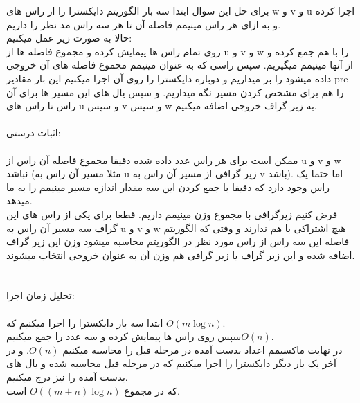 \problem{}
برای حل این سوال ابتدا سه بار الگوریتم دایکسترا را از
راس های w و v و u
اجرا کرده و به ازای هر راس
مینیمم فاصله آن تا هر سه راس مد نظر را داریم.\\
حالا به صورت زیر عمل میکنیم:\\
روی تمام راس ها پیمایش کرده و مجموع فاصله ها از u و v و w را با هم جمع
کرده و از آنها مینیمم میگیریم.
سپس راسی که به عنوان مینیمم مجموع فاصله های آن خروجی داده میشود را 
بر میداریم و دوباره دایکسترا را روی آن اجرا میکنیم این بار مقادیر pre را هم برای
مشخص کردن مسیر نگه میداریم.
و سپس یال های این مسیر ها برای آن راس تا 
راس های u و 
سپس v و
سپس w 
به زیر گراف خروجی اضافه میکنیم.\\\\
اثبات درستی:\\\\
ممکن است برای هر راس عدد داده شده دقیقا مجموع فاصله آن راس از u و v و w نباشد 
(مثلا مسیر آن راس به u زیر گرافی از مسیر آن راس به v باشد).
اما حتما یک راس وجود دارد که دقیقا با جمع کردن این سه مقدار
 اندازه مسیر مینیمم را به ما میدهد.\\
فرض کنیم زیرگرافی با مجموع وزن مینیمم داریم.
قطعا برای یکی از راس های این گراف سه مسیر آن راس به u و v و w 
هیچ اشتراکی با هم ندارند و وقتی که الگوریتم فاصله این سه راس از راس مورد نظر در
الگوریتم محاسبه میشود وزن این زیر گراف اضافه شده و این زیر گراف یا زیر گرافی هم وزن
آن به عنوان خروجی انتخاب میشوند.\\\\\\
تحلیل زمان اجرا:\\\\
ابتدا سه بار دایکسترا را اجرا میکنیم که $O(m\log{n})$.\\
سپس روی راس ها پیمایش کرده و سه عدد را جمع میکنیم$O(n)$.\\
در نهایت ماکسیمم اعداد بدست آمده در مرحله قبل را محاسبه میکنیم $O(n)$.
و در آخر یک بار دیگر دایکسترا را اجرا میکنیم که در مرحله قبل محاسبه شده و یال های بدست
آمده را نیز درج میکنیم.\\
 که در مجموع $O((m+n)\log{n})$ است.\\